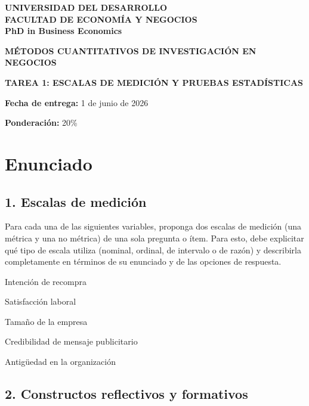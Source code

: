 \documentclass[12pt,letterpaper]{article}
\begin{document}
\begin{center}
{\large \textbf{UNIVERSIDAD DEL DESARROLLO}}\\
{\large \textbf{FACULTAD DE ECONOMÍA Y NEGOCIOS}}\\
{\large \textbf{PhD in Business Economics}}

\vspace{1em}

{\Large \textbf{MÉTODOS CUANTITATIVOS DE INVESTIGACIÓN EN NEGOCIOS}}

\vspace{0.7em}

{\large \textbf{TAREA 1: ESCALAS DE MEDICIÓN Y PRUEBAS ESTADÍSTICAS}}
\end{center}

\vspace{1em}

\textbf{Fecha de entrega:} 1 de junio de 2026

\textbf{Ponderación:} 20\%

\vspace{1em}

\section{Enunciado}

\subsection*{1. Escalas de medición}

Para cada una de las siguientes variables, proponga dos escalas de medición (una métrica y una no métrica) de una sola pregunta o ítem. Para esto, debe explicitar qué tipo de escala utiliza (nominal, ordinal, de intervalo o de razón) y describirla completamente en términos de su enunciado y de las opciones de respuesta.

\begin{opciones}
\item Intención de recompra
\item Satisfacción laboral
\item Tamaño de la empresa
\item Credibilidad de mensaje publicitario
\item Antigüedad en la organización
\end{opciones}

\vspace{1em}

\subsection*{2. Constructos reflectivos y formativos}
\end{document}
